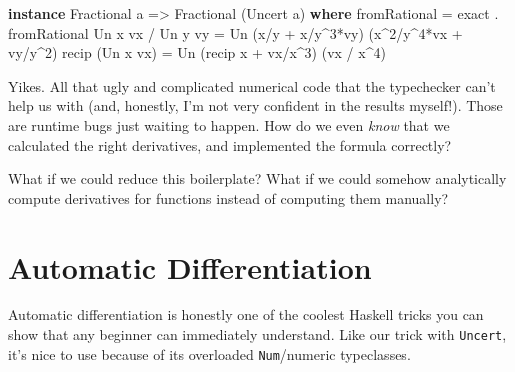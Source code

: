 \documentclass[]{article}
\newenvironment{Shaded}{}{}
\newcommand{\DataTypeTok}[1]{\textcolor[rgb]{0.56,0.13,0.00}{#1}}
\newcommand{\DecValTok}[1]{\textcolor[rgb]{0.25,0.63,0.44}{#1}}
\newcommand{\FunctionTok}[1]{\textcolor[rgb]{0.02,0.16,0.49}{#1}}
\newcommand{\KeywordTok}[1]{\textcolor[rgb]{0.00,0.44,0.13}{\textbf{#1}}}
\newcommand{\NormalTok}[1]{#1}
\newcommand{\OperatorTok}[1]{\textcolor[rgb]{0.40,0.40,0.40}{#1}}
\newcommand{\OtherTok}[1]{\textcolor[rgb]{0.00,0.44,0.13}{#1}}
\begin{document}
\begin{Shaded}
\begin{Highlighting}[]
\KeywordTok{instance} \DataTypeTok{Fractional}\NormalTok{ a }\OtherTok{=>} \DataTypeTok{Fractional}\NormalTok{ (}\DataTypeTok{Uncert}\NormalTok{ a) }\KeywordTok{where}
    \FunctionTok{fromRational}      \OtherTok{=}\NormalTok{ exact }\OperatorTok{.} \FunctionTok{fromRational}
    \DataTypeTok{Un}\NormalTok{ x vx }\OperatorTok{/} \DataTypeTok{Un}\NormalTok{ y vy }\OtherTok{=} \DataTypeTok{Un}\NormalTok{ (x}\OperatorTok{/}\NormalTok{y }\OperatorTok{+}\NormalTok{ x}\OperatorTok{/}\NormalTok{y}\OperatorTok{\^{}}\DecValTok{3}\OperatorTok{*}\NormalTok{vy)   (x}\OperatorTok{\^{}}\DecValTok{2}\OperatorTok{/}\NormalTok{y}\OperatorTok{\^{}}\DecValTok{4}\OperatorTok{*}\NormalTok{vx }\OperatorTok{+}\NormalTok{ vy}\OperatorTok{/}\NormalTok{y}\OperatorTok{\^{}}\DecValTok{2}\NormalTok{)}
    \FunctionTok{recip}\NormalTok{ (}\DataTypeTok{Un}\NormalTok{ x vx)   }\OtherTok{=} \DataTypeTok{Un}\NormalTok{ (}\FunctionTok{recip}\NormalTok{ x }\OperatorTok{+}\NormalTok{ vx}\OperatorTok{/}\NormalTok{x}\OperatorTok{\^{}}\DecValTok{3}\NormalTok{) (vx }\OperatorTok{/}\NormalTok{ x}\OperatorTok{\^{}}\DecValTok{4}\NormalTok{)}
\end{Highlighting}
\end{Shaded}

Yikes. All that ugly and complicated numerical code that the typechecker can't
help us with (and, honestly, I'm not very confident in the results myself!).
Those are runtime bugs just waiting to happen. How do we even \emph{know} that
we calculated the right derivatives, and implemented the formula correctly?

What if we could reduce this boilerplate? What if we could somehow analytically
compute derivatives for functions instead of computing them manually?

\hypertarget{automatic-differentiation}{%
\section{Automatic Differentiation}\label{automatic-differentiation}}

Automatic differentiation is honestly one of the coolest Haskell tricks you can
show that any beginner can immediately understand. Like our trick with
\texttt{Uncert}, it's nice to use because of its overloaded \texttt{Num}/numeric
typeclasses.
\end{document}
